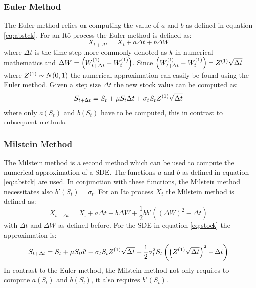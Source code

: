 \documentclass[a4paper,onecolumn]{IEEEtran}
\begin{document}
\subsubsection{Euler Method}
The Euler method relies on computing the value of $a$ and $b$ as defined in
equation \eqref{eq:abstck}. For an It\=o process the Euler method is defined as:
\begin{equation}\label{eq:euler}
X_{t + \Delta t} = X_t + a\Delta t + b\Delta W
\end{equation}
where $\Delta t$ is the time step more commonly denoted as $h$ in numerical
mathematics and $\Delta W = \left(W^{(1)}_{t + \Delta t} - W^{(1)}_t\right)$.
Since $\left(W^{(1)}_{t + \Delta t} - W^{(1)}_t\right) =
Z^{(1)}\sqrt{\Delta t}$ where $Z^{(1)}\sim N(0, 1)$ the numerical
approximation can easily be found using the Euler method. Given a step size
$\Delta t$ the new stock value can be computed as:
\begin{align}
S_{t + \Delta t} = S_t + \mu S_t\Delta t + \sigma_t S_t Z^{(1)}\sqrt{\Delta t}
\end{align}
where only $a(S_t)$ and $b(S_t)$ have to be computed, this in contrast to
subsequent methods.


\subsubsection{Milstein Method}
The Milstein method is a second method which can be used to compute the
numerical approximation of a SDE. The functions $a$ and $b$ as defined in
equation \eqref{eq:abstck} are used. In conjunction with these functions, the
Milstein method necessitates also $b'(S_t) = \sigma_t$. For an It\=o process
$X_t$ the Milstein method is defined as:
\begin{equation}\label{eq:mil}
X_{t + \Delta t} = X_t + a\Delta t + b\Delta W +
\frac{1}{2}bb'\left(\left(\Delta W\right)^2 - \Delta t\right)
\end{equation}
with $\Delta t$ and $\Delta W$ as defined before. For the SDE in
equation \eqref{eq:stock} the approximation is:
\begin{equation}
S_{t + \Delta t} = S_t + \mu S_t dt + \sigma_t S_t Z^{(1)}\sqrt{\Delta t} +
	\frac{1}{2} \sigma_t^2 S_t \left(\left(Z^{(1)}\sqrt{\Delta t}\right)^2 -
\Delta t\right)
\end{equation}
In contrast to the Euler method, the Milstein method not only requires to
compute $a(S_t)$ and $b(S_t)$, it also requires $b'(S_t)$.
\end{document}
